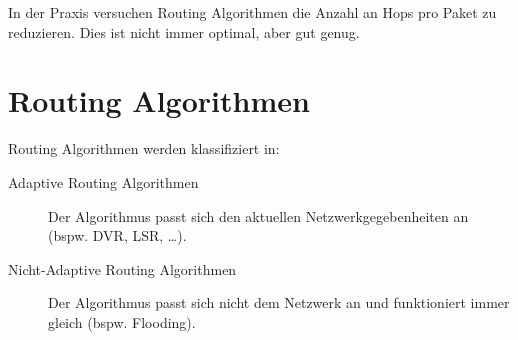 		In der Praxis versuchen Routing Algorithmen die Anzahl an Hops pro Paket zu reduzieren. Dies ist nicht immer optimal, aber gut genug.

	\section{Routing Algorithmen}
		Routing Algorithmen werden klassifiziert in:
		\begin{description}
			\item[Adaptive Routing Algorithmen] Der Algorithmus passt sich den aktuellen Netzwerkgegebenheiten an (bspw. DVR, LSR, \dots).
			\item[Nicht-Adaptive Routing Algorithmen] Der Algorithmus passt sich nicht dem Netzwerk an und funktioniert immer gleich (bspw. Flooding).
		\end{description}

